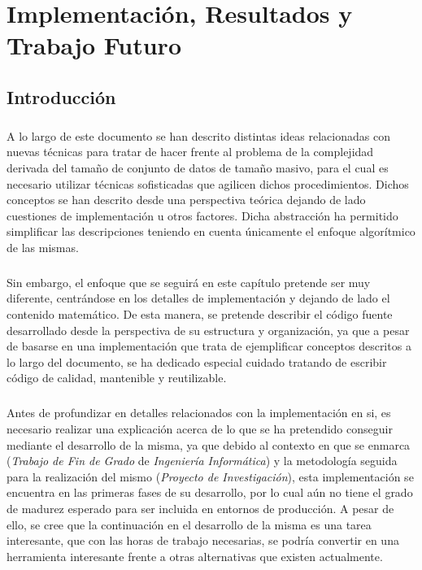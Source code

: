 \documentclass{subfiles}
\begin{document}
  \chapter{Implementación, Resultados y Trabajo Futuro}
  \label{chap:implementation}

    \section{Introducción}
    \label{sec:implementation_intro}

      \paragraph{}
      A lo largo de este documento se han descrito distintas ideas relacionadas con nuevas técnicas para tratar de hacer frente al problema de la complejidad derivada del tamaño de conjunto de datos de tamaño masivo, para el cual es necesario utilizar técnicas sofisticadas que agilicen dichos procedimientos. Dichos conceptos se han descrito desde una perspectiva teórica dejando de lado cuestiones de implementación u otros factores. Dicha abstracción ha permitido simplificar las descripciones teniendo en cuenta únicamente el enfoque algorítmico de las mismas.

      \paragraph{}
      Sin embargo, el enfoque que se seguirá en este capítulo pretende ser muy diferente, centrándose en los detalles de implementación y dejando de lado el contenido matemático. De esta manera, se pretende describir el código fuente desarrollado desde la perspectiva de su estructura y organización, ya que a pesar de basarse en una implementación que trata de ejemplificar conceptos descritos a lo largo del documento, se ha dedicado especial cuidado tratando de escribir código de calidad, mantenible y reutilizable.

      \paragraph{}
      Antes de profundizar en detalles relacionados con la implementación en si, es necesario realizar una explicación acerca de lo que se ha pretendido conseguir mediante el desarrollo de la misma, ya que debido al contexto en que se enmarca (\emph{Trabajo de Fin de Grado} de \emph{Ingeniería Informática}) y la metodología seguida para la realización  del mismo (\emph{Proyecto de Investigación}), esta implementación se encuentra en las primeras fases de su desarrollo, por lo cual aún no tiene el grado de madurez esperado para ser incluida en entornos de producción. A pesar de ello, se cree que la continuación en el desarrollo de la misma es una tarea interesante, que con las horas de trabajo necesarias, se podría convertir en una herramienta interesante frente a otras alternativas que existen actualmente.
\end{document}

